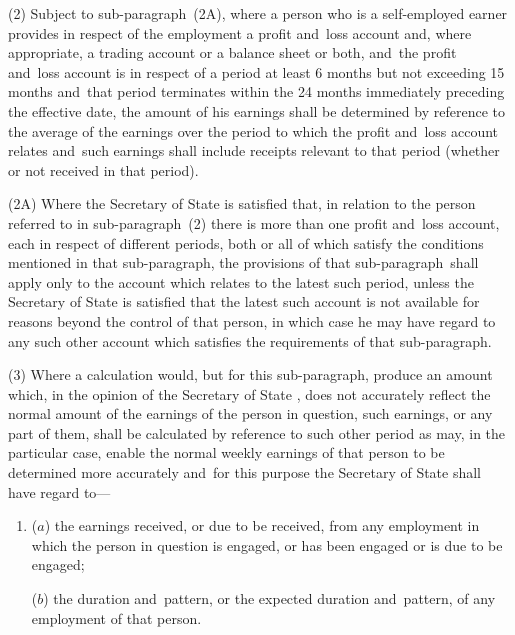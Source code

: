 \documentclass[12pt,a4paper]{article}
\begin{document}
(2) 
Subject to sub-paragraph~(2A), where  %
a person who is a self-\hspace{0pt}employed earner provides in respect of the employment a profit and~loss account and, where appropriate, a trading account or a balance sheet or both, and~the profit and~loss account is in respect of a period at least 6 months but not exceeding 15 months and~that period terminates within the 
24 months  %
immediately preceding the effective date, the amount of his earnings shall be determined by reference to the average of the earnings over the period to which the profit and~loss account relates and~such earnings shall include receipts relevant to that period (whether or not received in that period).

(2A) Where the 
Secretary of State  %
is satisfied that, in relation to the person referred to in sub-paragraph~(2) there is more than one profit and~loss account, each in respect of different periods, both or all of which satisfy the conditions mentioned in that sub-paragraph, the provisions of that sub-paragraph~shall apply only to the account which relates to the latest such period, unless 
the Secretary of State  %
is satisfied that the latest such account is not available for reasons beyond the control of that person, in which case he may have regard to any such other account which satisfies the requirements of that sub-paragraph.

(3) Where a calculation would, but for this sub-paragraph, produce an amount which, in the opinion of the 
Secretary of State%
, does not accurately reflect the normal amount of the earnings of the person in question, such earnings, or any part of them, shall be calculated by reference to such other period as may, in the particular case, enable the normal weekly earnings of that person to be determined more accurately and~for this purpose the 
Secretary of State  %
shall have regard to—
\begin{enumerate}\item[]
($a$) the earnings received, or due to be received, from any employment in which the person in question is engaged, or has been engaged or is due to be engaged;

($b$) the duration and~pattern, or the expected duration and~pattern, of any employment of that person.
\end{enumerate}
\end{document}
